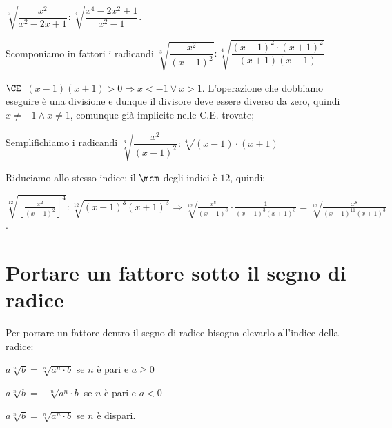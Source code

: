 \begin{exrig}
\begin{esempio}
 \(\sqrt[3]{\dfrac{x^2}{x^2-2x+1}}:\sqrt[4]{\dfrac{x^4-2x^2+1}{x^2-1}}\).

 \begin{enumeratea}
\item Scomponiamo in fattori i radicandi
 \(\sqrt[3]{\dfrac{x^2}{(x-1)^2}}:
 \sqrt[4]{\dfrac{(x-1)^2\cdot (x+1)^2}{(x+1)(x-1)}}\)
\item \(\CE\)\, \((x-1)(x+1)>0\Rightarrow x<-1\vee x>1\). 
 L'operazione che dobbiamo eseguire è una divisione e dunque il divisore deve 
 essere diverso da zero, quindi \(x\neq -1\wedge x\neq 1\), comunque già 
 implicite nelle C.E. trovate;
 
\begin{center}
 
\end{center}
\item Semplifichiamo i radicandi 
 \(\sqrt[3]{\dfrac{x^2}{(x-1)^2}}:\sqrt[4]{(x-1)\cdot (x+1)}\)
\item Riduciamo allo stesso indice: il \(\mcm\) degli indici è \(12\), quindi:

\(\sqrt[12]{\left[\frac{x^2}{(x-1)^2}\right]^4}:\sqrt[12]{(x-1)^3 (x+1)^3}
\Rightarrow 
\sqrt[12]{\frac{x^8}{(x-1)^8}\cdot \frac 1{(x-1)^3 (x+1)^3}}=
\sqrt[12]{\frac{x^8}{(x-1)^{11}(x+1)^3}}\).
\end{enumeratea}
\end{esempio}
\end{exrig}


\section{Portare un fattore sotto il segno di radice}
\label{sec:radici_portare_dentro}

Per portare un fattore dentro il segno di radice bisogna elevarlo all'indice 
della radice:
\begin{itemize*}
 \item \(a\sqrt[n]b=\sqrt[n]{a^n\cdot b}\) se \(n\) è pari e \(a\ge 0\)
 \item \(a\sqrt[n]b=-\sqrt[n]{a^n\cdot b}\) se \(n\) è pari e \(a<0\)
 \item \(a\sqrt[n]b=\sqrt[n]{a^n\cdot b}\) se \(n\) è dispari.
\end{itemize*}

